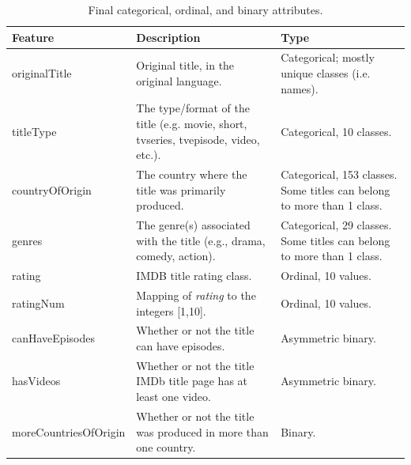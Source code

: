 \begin{table}[h]
    \centering
    \renewcommand{\arraystretch}{1.2}
    \scriptsize
    \begin{tabular}{|p{3cm}|p{6cm}|p{3cm}|} 
    \hline
    \textbf{Feature} & \textbf{Description} & \textbf{Type} \\ \hline
    originalTitle & Original title, in the original language. & Categorical; mostly unique classes (i.e. names). \\ \hline
    titleType & The type/format of the title (e.g. movie, short, tvseries, tvepisode, video, etc.). & Categorical, 10 classes. \\ \hline
    countryOfOrigin & The country where the title was primarily produced. & Categorical, 153 classes. Some titles can belong to more than 1 class. \\ \hline
    genres & The genre(s) associated with the title (e.g., drama, comedy, action). & Categorical, 29 classes. Some titles can belong to more than 1 class. \\ \hline
    rating & IMDB title rating class. & Ordinal, 10 values. \\ \hline
    ratingNum & Mapping of \textit{rating} to the integers [1,10]. & Ordinal, 10 values. \\ \hline
    canHaveEpisodes & Whether or not the title can have episodes. & Asymmetric binary. \\ \hline
    hasVideos & Whether or not the title IMDb title page has at least one video. & Asymmetric binary. \\ \hline
    moreCountriesOfOrigin & Whether or not the title was produced in more than one country. & Binary. \\ \hline
    \end{tabular}
    \caption{Final categorical, ordinal, and binary attributes.}
    \label{tab:dataset_categorical}
\end{table}
